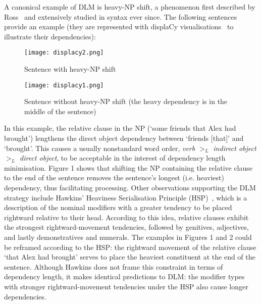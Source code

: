 \documentclass{article}
\begin{document}
A canonical example of DLM is heavy-NP shift, a phenomenon first described by Ross~\cite{ross1967a} and extensively studied in syntax ever since. The following sentences provide an example (they are represented with displaCy visualisations~\cite{spacy2} to illustrate their dependencies):
\begin{figure}[H]
	\centering
	\texttt{[image: displacy2.png]}
	\caption{Sentence with heavy-NP shift}
	\label{fig:fig1}
\end{figure}
\begin{figure}[H]
	\centering
	\texttt{[image: displacy1.png]}
	\caption{Sentence without heavy-NP shift (the heavy dependency is in the middle of the sentence)}
	\label{fig:fig2}
\end{figure}
In this example, the relative clause in the NP (`some friends that Alex had brought') lengthens the direct object dependency between `friends [that]' and `brought'. This causes a usually nonstandard word order, \textit{verb $>_{L}$ indirect object $>_{L}$ direct object}, to be acceptable in the interest of dependency length minimisation. Figure 1 shows that shifting the NP containing the relative clause to the end of the sentence removes the sentence's longest (i.e. heaviest) dependency, thus facilitating processing. Other observations supporting the DLM strategy include Hawkins' Heaviness Serialisation Principle (HSP)~\cite{hawkins1990}, which is a description of the nominal modifiers with a greater tendency to be placed rightward relative to their head. According to this idea, relative clauses exhibit the strongest rightward-movement tendencies, followed by genitives, adjectives, and lastly demonstratives and numerals. The examples in Figures 1 and 2 could be reframed according to the HSP: the rightward movement of the relative clause `that Alex had brought' serves to place the heaviest constituent at the end of the sentence. Although Hawkins does not frame this constraint in terms of dependency length, it makes identical predictions to DLM: the modifier types with stronger rightward-movement tendencies under the HSP also cause longer dependencies. 
\end{document}
